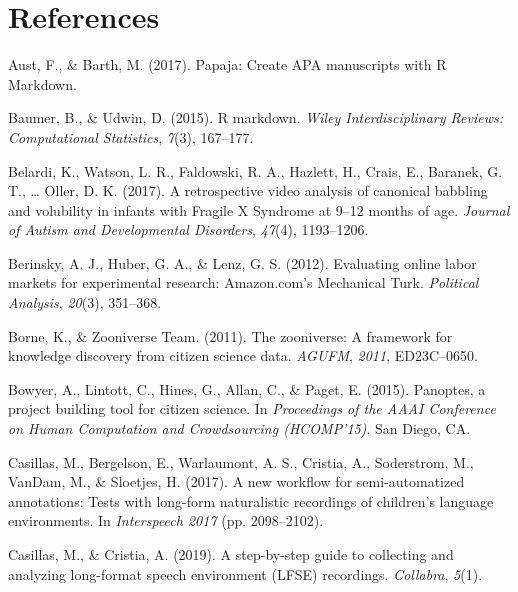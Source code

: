 \documentclass[english,,man]{apa6}
\begin{document}
\hypertarget{references}{%
\section{References}\label{references}}

\setlength{\parindent}{-0.5in}
\setlength{\leftskip}{0.5in}

\hypertarget{refs}{}
\leavevmode\hypertarget{ref-aust2017papaja}{}%
Aust, F., \& Barth, M. (2017). Papaja: Create APA manuscripts with R Markdown.

\leavevmode\hypertarget{ref-baumer2015r}{}%
Baumer, B., \& Udwin, D. (2015). R markdown. \emph{Wiley Interdisciplinary Reviews: Computational Statistics}, \emph{7}(3), 167--177.

\leavevmode\hypertarget{ref-belardi2017retrospective}{}%
Belardi, K., Watson, L. R., Faldowski, R. A., Hazlett, H., Crais, E., Baranek, G. T., \ldots{} Oller, D. K. (2017). A retrospective video analysis of canonical babbling and volubility in infants with Fragile X Syndrome at 9--12 months of age. \emph{Journal of Autism and Developmental Disorders}, \emph{47}(4), 1193--1206.

\leavevmode\hypertarget{ref-berinsky2012evaluating}{}%
Berinsky, A. J., Huber, G. A., \& Lenz, G. S. (2012). Evaluating online labor markets for experimental research: Amazon.com's Mechanical Turk. \emph{Political Analysis}, \emph{20}(3), 351--368.

\leavevmode\hypertarget{ref-borne2011zooniverse}{}%
Borne, K., \& Zooniverse Team. (2011). The zooniverse: A framework for knowledge discovery from citizen science data. \emph{AGUFM}, \emph{2011}, ED23C--0650.

\leavevmode\hypertarget{ref-bowyer2015panoptes}{}%
Bowyer, A., Lintott, C., Hines, G., Allan, C., \& Paget, E. (2015). Panoptes, a project building tool for citizen science. In \emph{Proceedings of the AAAI Conference on Human Computation and Crowdsourcing (HCOMP'15)}. San Diego, CA.

\leavevmode\hypertarget{ref-casillas2017new}{}%
Casillas, M., Bergelson, E., Warlaumont, A. S., Cristia, A., Soderstrom, M., VanDam, M., \& Sloetjes, H. (2017). A new workflow for semi-automatized annotations: Tests with long-form naturalistic recordings of children's language environments. In \emph{Interspeech 2017} (pp. 2098--2102).

\leavevmode\hypertarget{ref-casillas2019step}{}%
Casillas, M., \& Cristia, A. (2019). A step-by-step guide to collecting and analyzing long-format speech environment (LFSE) recordings. \emph{Collabra}, \emph{5}(1).
\end{document}
